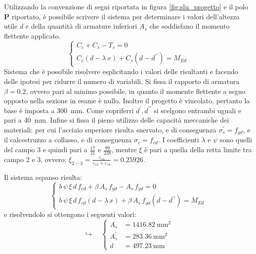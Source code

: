 Utilizzando la convenzione di segni riportata in figura \ref{fig:slu_progetto} e il polo $\mathbf{P}$ riportato, è possibile scrivere il sistema per determinare i valori dell'altezza utile $d$ e della quantità di armature inferiori $A_s$ che soddisfano il momento flettente applicato. 
\begin{equation}
  \begin{cases}
    C_c + C_s - T_s = 0 \\
    C_c \left(d - \lambda\,x\right) + C_s \left(d - d^{\prime\prime}\right) = M_{Ed}
  \end{cases}
\end{equation}
Sistema che è possibile risolvere esplicitando i valori delle risultanti e facendo delle ipotesi per ridurre il numero di variabili. 
Si fissa il rapporto di armatura $\beta = 0.2$, ovvero pari al minimo possibile, in quanto il momente flettente a segno opposto nella sezione in esame è nullo.
Inoltre il progetto è vincolato, pertanto la base è imposta a \SI{300}{\milli\metre}.
Come copriferri $d^\prime,d^{\prime\prime}$ si scelgono entrambi uguali e pari a \SI{40}{\milli\metre}.
Infine si fissa il pieno utilizzo delle capacità meccaniche dei materiali: per cui l'acciaio superiore risulta snervato, e di conseguenza $\sigma_s^\prime = f_{yd}$, e il calcestruzzo a collasso, e di conseguenza $\sigma_c = f_{cd}$.
I coefficienti $\lambda$ e $\psi$ sono quelli del campo 3 e quindi pari a $\frac{17}{21}$ e $\frac{99}{238}$, mentre $\xi$ è pari a quella della retta limite tra campo 2 e 3, ovvero: $\xi_{2-3} = \frac{\varepsilon_{cu}}{\varepsilon_{cu} + \varepsilon_{su}} = \num{0.25926}$.

Il sistema espanso risulta:
\begin{equation}
  \begin{cases}
    b \, \psi \, \xi \, d \, f_{cd} + \beta \, A_s \, f_{yd} - A_s \, f_{yd} = 0 \\
    b \, \psi \, \xi \, d \, f_{cd} \left(d - \lambda\,x\right) + \beta \, A_s \, f_{yd} \left(d - d^{\prime\prime}\right) = M_{Ed}
  \end{cases}
\label{eq:sistemaSLU}
\end{equation}
e risolvendolo si ottengono i seguenti valori:
\begin{equation}
  \hookrightarrow \quad
  \begin{cases}
    A_s &= \SI{1416.82}{\milli\metre\squared} \\
    A_s^\prime &= \SI{283.36}{\milli\metre\squared} \\
    d &= \SI{497.23}{\milli\metre}
  \end{cases}
\end{equation}

